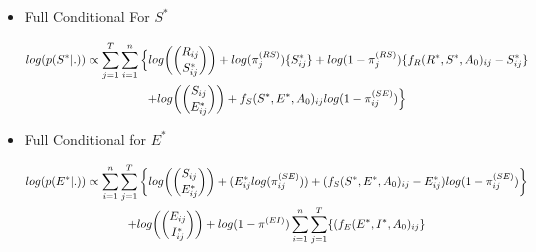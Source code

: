 \documentclass[12pt]{article}
\begin{document}
\begin{itemize}
    \item{Full Conditional For $S^*$}
    \begin{center}
        \begin{multline}
        \displaystyle
        log(p(S^*|.))\propto 
            \sum_{j=1}^T\sum_{i=1}^n\Big\{log\bigg(\dbinom{R_{ij}}{S^*_{ij}}\bigg) + log(\pi_j^{(RS)})\{S^*_{ij}\} + 
                log(1-\pi_j^{(RS)})\{f_R(R^*, S^*, A_0)_{ij} - S^*_{ij}\}\\ 
            + log\bigg(\dbinom{S_{ij}}{E^*_{ij}}\bigg) + f_S(S^*, E^*, A_0)_{ij}log(1-\pi_{ij}^{(SE)})\Big\}
        \end{multline}
    \end{center}

    \item{Full Conditional for $E^*$}
    \begin{center}
    \begin{multline}
        \displaystyle
        log(p(E^*|.))\propto \sum_{i=1}^n \sum_{j=1}^T\bigg\{log\bigg(\dbinom{S_{ij}}{E^*_{ij}}\bigg) + 
                (E^*_{ij}log(\pi_{ij}^{(SE)})) + (f_S(S^*, E^*, A_0)_{ij} - E^*_{ij})log(1-\pi_{ij}^{(SE)})\bigg\} \\
                + log\bigg(\dbinom{E_{ij}}{I^*_{ij}}\bigg) + log(1-\pi^{(EI)})\sum_{i=1}^n\sum_{j=1}^T\{(f_E(E^*, I^*, A_0)_{ij}\}\\
    \end{multline}
    \end{center}


\end{itemize}
\end{document}
